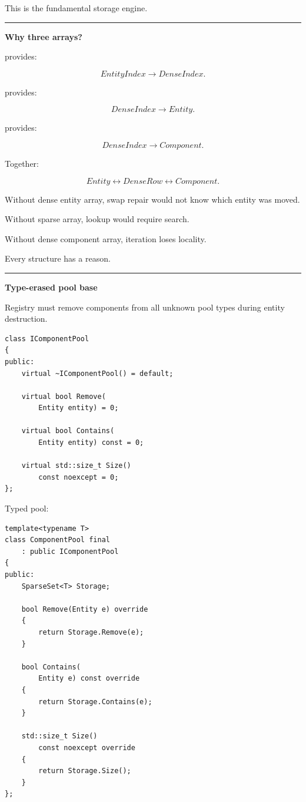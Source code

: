This is the fundamental storage engine.

\begin{center}\rule{0.5\linewidth}{0.5pt}\end{center}

\textbf{Why three arrays?}

 provides:

\[
EntityIndex\rightarrow DenseIndex.
\]

 provides:

\[
DenseIndex\rightarrow Entity.
\]

 provides:

\[
DenseIndex\rightarrow Component.
\]

Together:

\[
Entity
\leftrightarrow
DenseRow
\leftrightarrow
Component.
\]

Without dense entity array, swap repair would not know which entity was moved.

Without sparse array, lookup would require search.

Without dense component array, iteration loses locality.

Every structure has a reason.

\begin{center}\rule{0.5\linewidth}{0.5pt}\end{center}

\textbf{Type-erased pool base}

Registry must remove components from all unknown pool types during entity destruction.

\begin{verbatim}
class IComponentPool
{
public:
    virtual ~IComponentPool() = default;

    virtual bool Remove(
        Entity entity) = 0;

    virtual bool Contains(
        Entity entity) const = 0;

    virtual std::size_t Size()
        const noexcept = 0;
};
\end{verbatim}

Typed pool:

\begin{verbatim}
template<typename T>
class ComponentPool final
    : public IComponentPool
{
public:
    SparseSet<T> Storage;

    bool Remove(Entity e) override
    {
        return Storage.Remove(e);
    }

    bool Contains(
        Entity e) const override
    {
        return Storage.Contains(e);
    }

    std::size_t Size()
        const noexcept override
    {
        return Storage.Size();
    }
};
\end{verbatim}

